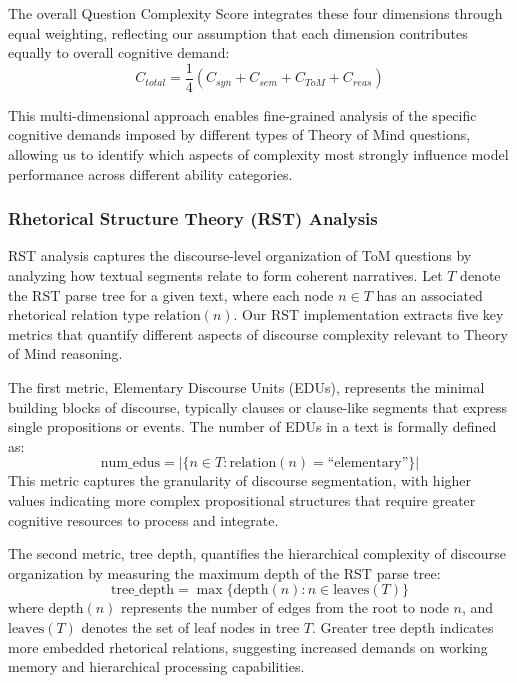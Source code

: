 \documentclass[12pt]{article}
\begin{document}
The overall Question Complexity Score integrates these four dimensions through equal weighting, reflecting our assumption that each dimension contributes equally to overall cognitive demand:
\begin{equation}
C_{total} = \frac{1}{4}(C_{syn} + C_{sem} + C_{ToM} + C_{reas})
\end{equation}

This multi-dimensional approach enables fine-grained analysis of the specific cognitive demands imposed by different types of Theory of Mind questions, allowing us to identify which aspects of complexity most strongly influence model performance across different ability categories.

\subsubsection{Rhetorical Structure Theory (RST) Analysis}

RST analysis captures the discourse-level organization of ToM questions by analyzing how textual segments relate to form coherent narratives. Let $T$ denote the RST parse tree for a given text, where each node $n \in T$ has an associated rhetorical relation type $\text{relation}(n)$. Our RST implementation extracts five key metrics that quantify different aspects of discourse complexity relevant to Theory of Mind reasoning.

The first metric, Elementary Discourse Units (EDUs), represents the minimal building blocks of discourse, typically clauses or clause-like segments that express single propositions or events. The number of EDUs in a text is formally defined as:
\begin{equation}
\text{num\_edus} = |\{n \in T : \text{relation}(n) = \text{``elementary''}\}|
\end{equation}
This metric captures the granularity of discourse segmentation, with higher values indicating more complex propositional structures that require greater cognitive resources to process and integrate.

The second metric, tree depth, quantifies the hierarchical complexity of discourse organization by measuring the maximum depth of the RST parse tree:
\begin{equation}
\text{tree\_depth} = \max\{\text{depth}(n) : n \in \text{leaves}(T)\}
\end{equation}
where $\text{depth}(n)$ represents the number of edges from the root to node $n$, and $\text{leaves}(T)$ denotes the set of leaf nodes in tree $T$. Greater tree depth indicates more embedded rhetorical relations, suggesting increased demands on working memory and hierarchical processing capabilities.
\end{document}
